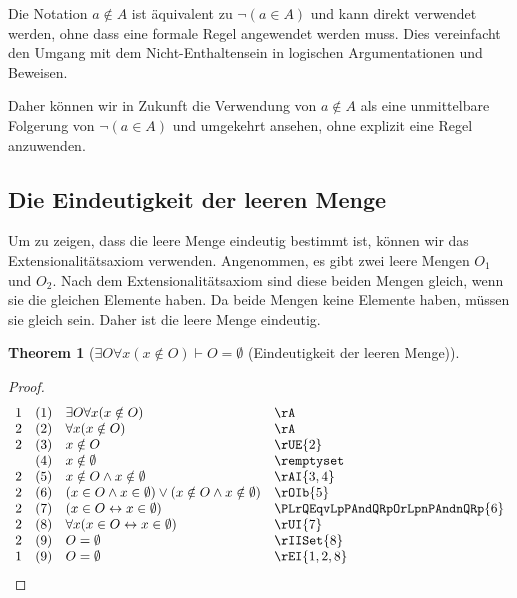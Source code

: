 \documentclass{book}
\theoremstyle{plain}
\newtheorem{theorem}{Theorem}
\theoremstyle{remark}
\theoremstyle{definition}
\begin{document}
Die Notation \(a \notin A\) ist äquivalent zu \(\neg(a \in A)\) und kann direkt verwendet werden, ohne dass eine formale Regel angewendet werden muss. Dies vereinfacht den Umgang mit dem Nicht-Enthaltensein in logischen Argumentationen und Beweisen.

Daher können wir in Zukunft die Verwendung von \(a \notin A\) als eine unmittelbare Folgerung von \(\neg(a \in A)\) und umgekehrt ansehen, ohne explizit eine Regel anzuwenden.

\subsection{Die Eindeutigkeit der leeren Menge}

Um zu zeigen, dass die leere Menge eindeutig bestimmt ist, können wir das Extensionalitätsaxiom verwenden. Angenommen, es gibt zwei leere Mengen $O_1$ und $O_2$. Nach dem Extensionalitätsaxiom sind diese beiden Mengen gleich, wenn sie die gleichen Elemente haben. Da beide Mengen keine Elemente haben, müssen sie gleich sein. Daher ist die leere Menge eindeutig.

\label{ExOFaxLpxNotinORpImpOEqualsEmptyset}
\begin{theorem}[\(\exists O\forall x (x \notin O)\vdash O = \emptyset\) (Eindeutigkeit der leeren Menge)]
\end{theorem}
\begin{proof}
	\[
	\begin{array}{llll}
		1 & (1) & \exists O\forall x (x \notin O) & \rA \\
		2 & (2) & \forall x (x \notin O) & \rA \\
		2 & (3) & x \notin O & \rUE{2} \\
		& (4) & x \notin \emptyset & \remptyset \\
		2 & (5) & x \notin O\land x\notin\emptyset & \rAI{3,4} \\
		2 & (6) & (x \in O\land x\in\emptyset)\lor(x \notin O\land x\notin\emptyset) & \rOIb{5} \\
		2 & (7) & (x \in O\leftrightarrow x \in \emptyset) & \PLrQEqvLpPAndQRpOrLpnPAndnQRp{6} \\
		2 & (8) & \forall x(x \in O\leftrightarrow x \in \emptyset) & \rUI{7} \\
		2 & (9) & O=\emptyset & \rIISet{8} \\
		1 & (9) & O=\emptyset & \rEI{1,2,8} \\
	\end{array}
	\]
\end{proof}
\end{document}
